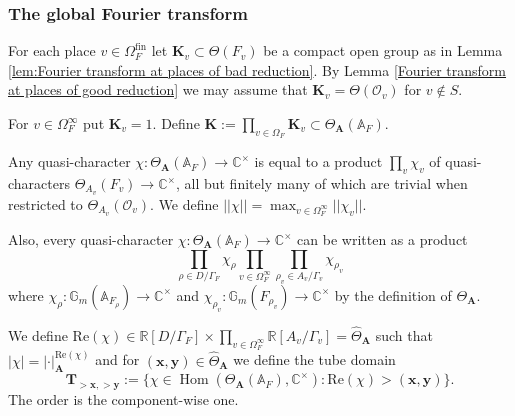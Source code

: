 \documentclass[a4paper,11pt,reqno]{amsart}
\newcommand{\R}{\mathbb{R}}
\newcommand{\C}{\mathbb{C}}
\newcommand{\G}{\mathbb{G}}
\newcommand{\A}{\mathbb{A}}
\DeclareMathOperator{\Hom}{Hom}
\renewcommand{\Re}{\mathrm{Re}}
\theoremstyle{definition}
\begin{document}
\subsubsection{The global Fourier transform}
For each place $v \in \Omega_F^{\text{fin}}$ let $\mathbf{K}_v \subset \Theta(F_v)$ be a compact open group as in Lemma \ref{lem:Fourier transform at places of bad reduction}. By Lemma \ref{Fourier transform at places of good reduction} we may assume that $\mathbf{K}_v = \Theta(\mathcal{O}_v)$ for $v \not \in S$.

For $v \in \Omega_F^{\infty}$ put $\mathbf{K}_v = 1$. Define $\mathbf{K} := \prod_{v \in \Omega_{F}} \mathbf{K}_v \subset \Theta_{\mathbf{A}}(\A_F)$. 

Any quasi-character $\chi: \Theta_{\mathbf{A}}(\A_F) \to \C^{\times}$ is equal to a product $\prod_v \chi_v$ of quasi-characters $\Theta_{A_v}(F_v) \to \C^{\times}$, all but finitely many of which are trivial when restricted to $\Theta_{A_v}(\mathcal{O}_v)$. We define $||\chi|| = \max_{v \in \Omega_F^{\infty}} ||\chi_v||$.

Also, every quasi-character $\chi: \Theta_{\mathbf{A}}(\A_F) \to \C^{\times}$ can be written as a product 
\[
\prod_{\rho \in D / \Gamma_F} \chi_{\rho} \prod_{v \in \Omega_{F}^{\infty}} \prod_{\rho_v \in A_v /\Gamma_v} \chi_{\rho_v}
\] where $\chi_{\rho}: \G_m(\A_{F_{\rho}}) \to \C^{\times}$ and $\chi_{\rho_v}: \G_m(F_{\rho_v}) \to \C^{\times}$ by the definition of $\Theta_{\mathbf{A}}$.

We define $\Re(\chi) \in \R[D / \Gamma_F] \times \prod_{v \in \Omega_{F}^{\infty}} \R[A_v/\Gamma_v] = \hat{\Theta}_{\mathbf{A}}$ such that $|\chi| = |\cdot|_{\mathbf{A}}^{\Re(\chi)}$ and for $(\mathbf{x}, \mathbf{y}) \in \hat{\Theta}_{\mathbf{A}}$ we define the tube domain
\[
\mathbf{T}_{> \mathbf{x}, > \mathbf{y}} := \{\chi \in \Hom(\Theta_{\mathbf{A}}(\A_F), \C^{\times}) : \Re(\chi) > (\mathbf{x}, \mathbf{y})\}.
\]
The order is the component-wise one.
\end{document}
